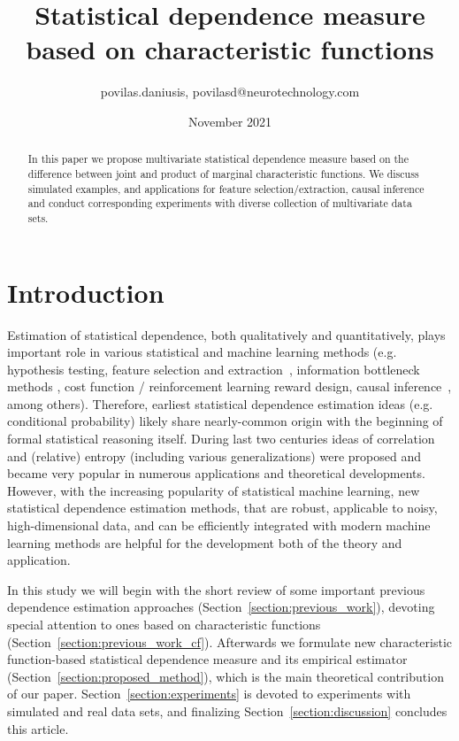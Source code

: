 \documentclass{article}
\title{Statistical dependence measure based on characteristic functions}
\author{povilas.daniusis, povilasd@neurotechnology.com}
\date{November 2021}
\begin{document}
\maketitle

\begin{abstract}
    In this paper we propose  multivariate statistical dependence measure based on the difference between joint and product of marginal characteristic functions. We discuss simulated examples, and applications for feature selection/extraction, causal inference and conduct corresponding experiments with diverse collection of multivariate data sets.
\end{abstract}

\section{Introduction}
Estimation of statistical dependence, both qualitatively and quantitatively, plays important role in various statistical and machine learning methods (e.g. hypothesis testing, feature selection and extraction~\cite{?}, information bottleneck methods \cite{?}, cost function / reinforcement learning reward design, causal inference~\cite{?}, among others). Therefore, earliest statistical dependence estimation ideas (e.g. conditional probability) likely share nearly-common origin with the beginning of formal statistical reasoning itself. During last two centuries ideas of correlation and (relative) entropy (including various generalizations) were proposed and became very popular in numerous applications and theoretical developments. However, with the increasing popularity of statistical machine learning, new statistical dependence estimation methods, that are robust, applicable to noisy, high-dimensional data, and can be efficiently integrated with modern machine learning methods are helpful for the development both of the theory and application.

In this study we will begin with the short review of some important previous dependence estimation approaches (Section~\ref{section:previous_work}), devoting special attention to ones based on characteristic functions (Section~\ref{section:previous_work_cf}). Afterwards we formulate new characteristic function-based statistical dependence measure and its empirical estimator (Section~\ref{section:proposed_method}), which is the main theoretical contribution of our paper. Section~\ref{section:experiments} is devoted to experiments with simulated and real data sets, and finalizing Section~\ref{section:discussion} concludes this article.
\end{document}
